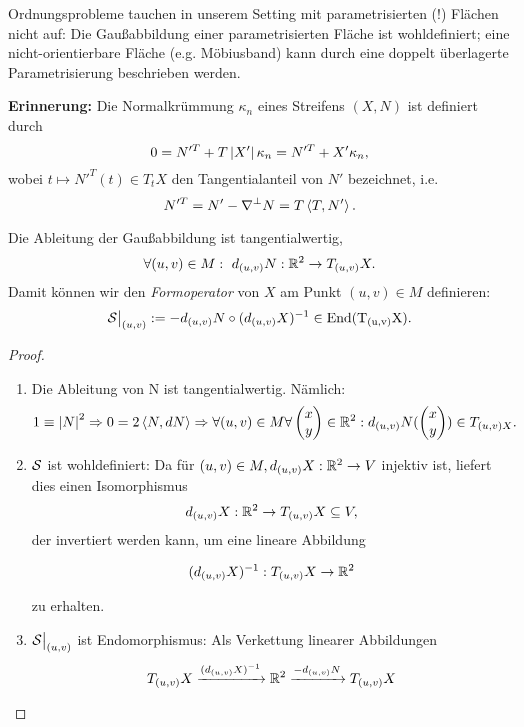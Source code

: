 \begin{remark}
	
	Ordnungsprobleme tauchen in unserem Setting mit parametrisierten (!) Flächen nicht auf: Die Gaußabbildung einer parametrisierten Fläche ist wohldefiniert; eine nicht-orientierbare Fläche (e.g. Möbiusband) kann durch eine doppelt überlagerte Parametrisierung beschrieben werden.
	
\end{remark}


\textbf{Erinnerung:} Die Normalkrümmung $ \kappa_n $ eines Streifens $(X,N) $ ist definiert durch 
	\[ 0=N'^T + T\left| X'\right| \kappa_n = N'^T + X'\kappa_n, \]
wobei $ t \mapsto N'^T(t) \in T_tX $ den Tangentialanteil von $ N' $ bezeichnet, i.e.
	\[ N'^T = N' - \nabla^\perp N = T\left \langle T,N' \right\rangle. \]

\begin{lemma, definition}
	
	Die Ableitung der Gaußabbildung ist tangentialwertig,
	\[ \forall (u,v) \in M : ~ d_{(u,v)}N : \mathbb R^2 \rightarrow T_{(u,v)}X. \]
	Damit können wir den \emph{Formoperator} von $ X $ am Punkt $ (u,v) \in M $ definieren:
	\[ \mathcal S\big|_{(u,v)}:= - d_{(u,v)}N \circ (d_{(u,v)}X)^{-1} \in \mathrm{End(T_{(u,v)}X)}. \]
	
\end{lemma, definition}

\begin{proof}
	
	\begin{enumerate}
		
		\item Die Ableitung von N ist tangentialwertig. Nämlich:
			\[ 1 \equiv \left| N\right|^2 \Rightarrow 0 = 2 \left \langle N,dN \right\rangle \Rightarrow \forall (u,v) \in M \forall \begin{pmatrix} x \\y \end{pmatrix} \in \mathbb R^2 : d_{(u,v)}N(\begin{pmatrix} x \\y \end{pmatrix}) \in T_{(u,v)X}. \]
		
		\item  $\mathcal S$ ist wohldefiniert:
		Da für $ (u,v) \in M, d_{(u,v)}X: \mathbb R^2 \rightarrow V $ injektiv ist, liefert dies einen Isomorphismus
			\[ d_{(u,v)}X: \mathbb R^2 \rightarrow T_{(u,v)}X \subseteq V, \]
		der invertiert werden kann, um eine lineare Abbildung
		
			\[ (d_{(u,v)}X)^{-1}: T_{(u,v)}X \rightarrow \mathbb R^2 \]
		
		zu erhalten.
		
		\item $ \mathcal S\big|_{(u,v)} $ ist Endomorphismus:
		Als Verkettung linearer Abbildungen
			\[ T_{(u,v)}X \xrightarrow{(d_{(u,v)}X)^{-1}} \mathbb R^2 \xrightarrow{-d_{(u,v)}N} T_{(u,v)}X \]
		
	\end{enumerate}
	
\end{proof}

